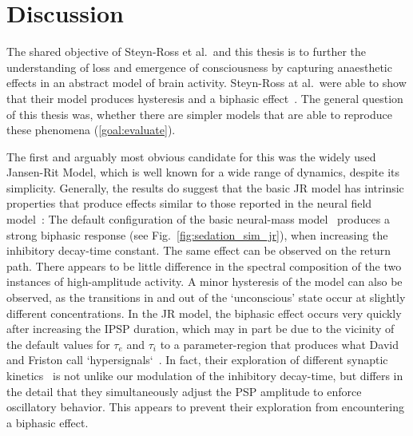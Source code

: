 \chapter{Discussion}

The shared objective of Steyn-Ross et al.\ and this thesis
is to further the understanding of loss and emergence of consciousness
by capturing anaesthetic effects in an abstract model of brain activity.
Steyn-Ross at al.\ were able to show
that their model produces hysteresis and a biphasic effect~\cite{hutt_progress_2011}.
The general question of this thesis was,
whether there are simpler models
that are able to reproduce these phenomena (\ref{goal:evaluate}).

The first and arguably most obvious candidate for this was the widely used Jansen-Rit Model,
which is well known for a wide range of dynamics, despite its simplicity.
Generally, the results do suggest that the basic JR model has intrinsic properties that produce
effects similar to those reported in the neural field model~\cite{hutt_progress_2011}:
The default configuration of the basic neural-mass model~\cite{jansen_electroencephalogram_1995}
produces a strong biphasic response (see Fig.~\ref{fig:sedation_sim_jr}),
when increasing the inhibitory decay-time constant.
The same effect can be observed on the return path.
There appears to be little difference in the spectral composition of the two instances of high-amplitude activity.
A minor hysteresis of the model can also be observed, as the transitions in and out of the `unconscious' state
occur at slightly different concentrations.
In the JR model, the biphasic effect occurs very quickly after increasing the IPSP duration, which may in part be due
to the vicinity of the default values for $\tau_e$ and $\tau_i$ to a parameter-region that produces what David and Friston call
`hypersignals`~\cite{david_neural_2003}.
In fact, their exploration of different synaptic kinetics~\cite[Fig. 4]{david_neural_2003}
is not unlike our modulation of the inhibitory decay-time,
but differs in the detail that they simultaneously adjust the PSP amplitude to enforce oscillatory behavior.
This appears to prevent their exploration from encountering a biphasic effect.

